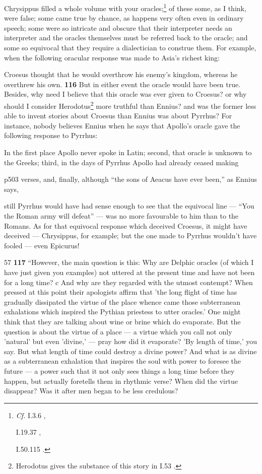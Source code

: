 Chrysippus filled a whole volume with your oracles;\texthebrew{}\footnote{\emph{Cf.}
I.3.6 ,

I.19.37 ,

I.50.115 .

} of these some, as I think, were false; some came true by chance, as happens very often even in ordinary speech; some were so intricate and obscure that their interpreter needs an interpreter and the oracles themselves must be referred back to the oracle; and some so equivocal that they require a dialectician to construe them. For example, when the following oracular response was made to Asia's richest king:

Croesus thought that he would overthrow his enemy's kingdom, whereas he overthrew his own. \textbf{116} But in either event the oracle would have been true. Besides, why need I believe that this oracle was ever given to Croesus? or why should I consider Herodotus\texthebrew{}\footnote{Herodotus gives the substance of this story in I.53 .

} more truthful than Ennius? and was the former less able to invent stories about Croesus than Ennius was about Pyrrhus? For instance, nobody believes Ennius when he says that Apollo's oracle gave the following response to Pyrrhus:

In the first place Apollo never spoke in Latin; second, that oracle is unknown to the Greeks; third, in the days of Pyrrhus Apollo had already ceased making

p503 verses, and, finally, although ``the sons of Aeacus have ever been,'' as Ennius says,

still Pyrrhus would have had sense enough to see that the equivocal line \texthebrew{—} ``You the Roman army will defeat'' \texthebrew{—} was no more favourable to him than to the Romans. As for that equivocal response which deceived Croesus, it might have deceived \texthebrew{—} Chrysippus, for example; but the one made to Pyrrhus wouldn't have fooled \texthebrew{—} even Epicurus!

57
\textbf{117} ``However, the main question is this: Why are Delphic oracles (of which I have just given you examples) not uttered at the present time and have not been for a long time?\texthebrew{} c And why are they regarded with the utmost contempt? When pressed at this point their apologists affirm that 'the long flight of time has gradually dissipated the virtue of the place whence came those subterranean exhalations which inspired the Pythian priestess to utter oracles.' One might think that they are talking about wine or brine which do evaporate. But the question is about the virtue of a place \texthebrew{—} a virtue which you call not only 'natural' but even 'divine,' \texthebrew{—} pray how did it evaporate? 'By length of time,' you say. But what length of time could destroy a divine power? And what is as divine as a subterranean exhalation that inspires the soul with power to foresee the future \texthebrew{—} a power such that it not only sees things a long time before they happen, but actually foretells them in rhythmic verse? When did the virtue disappear? Was it after men began to be less credulous?

